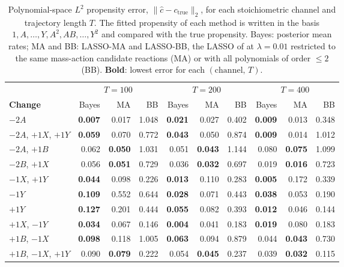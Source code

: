 \begin{table}[htbp]
\centering
\small
\caption{%
  Polynomial-space $L^2$ propensity error, $\|\hat{c} - c_{\mathrm{true}}\|_2$, for each stoichiometric
  channel and trajectory length $T$. The fitted propensity of each method is written in the basis
  $1, A, \dots, Y, A^2, AB, \dots, Y^2$ and compared with the true propensity. Bayes: posterior mean rates;
  MA and BB: LASSO-MA and LASSO-BB, the LASSO of \cite{siam_Zhang2019} at $\lambda = 0.01$
  restricted to the same mass-action candidate reactions (MA) or with all polynomials of order $\le 2$ (BB).
  \textbf{Bold}: lowest error for each $(\text{channel},\,T)$.
}
\label{tab:comparison-l2}
\setlength{\tabcolsep}{3pt}
\begin{tabular}{l|rrr|rrr|rrr}
\toprule
\multicolumn{1}{c}{} & \multicolumn{3}{c}{$T=100$} & \multicolumn{3}{c}{$T=200$} & \multicolumn{3}{c}{$T=400$} \\
\cmidrule(lr){2-4}\cmidrule(lr){5-7}\cmidrule(lr){8-10}
\textbf{Change} & Bayes & MA & BB & Bayes & MA & BB & Bayes & MA & BB \\
\midrule
$-2A$ & \textbf{0.007} & 0.017 & 1.048 & \textbf{0.021} & 0.027 & 0.402 & \textbf{0.009} & 0.013 & 0.348 \\
$-2A$, $+1X$, $+1Y$ & \textbf{0.059} & 0.070 & 0.772 & \textbf{0.043} & 0.050 & 0.874 & \textbf{0.009} & 0.014 & 1.012 \\
$-2A$, $+1B$ & 0.062 & \textbf{0.050} & 1.031 & 0.051 & \textbf{0.043} & 1.144 & 0.080 & \textbf{0.075} & 1.099 \\
$-2B$, $+1X$ & 0.056 & \textbf{0.051} & 0.729 & 0.036 & \textbf{0.032} & 0.697 & 0.019 & \textbf{0.016} & 0.723 \\
$-1X$, $+1Y$ & \textbf{0.044} & 0.098 & 0.226 & \textbf{0.013} & 0.110 & 0.283 & \textbf{0.005} & 0.172 & 0.339 \\
$-1Y$ & \textbf{0.109} & 0.552 & 0.644 & \textbf{0.028} & 0.071 & 0.443 & \textbf{0.038} & 0.053 & 0.190 \\
$+1Y$ & \textbf{0.127} & 0.201 & 0.444 & \textbf{0.055} & 0.082 & 0.393 & \textbf{0.012} & 0.046 & 0.144 \\
$+1X$, $-1Y$ & \textbf{0.034} & 0.067 & 0.146 & \textbf{0.004} & 0.041 & 0.183 & \textbf{0.019} & 0.080 & 0.183 \\
$+1B$, $-1X$ & \textbf{0.098} & 0.118 & 1.005 & \textbf{0.063} & 0.094 & 0.879 & 0.044 & \textbf{0.043} & 0.730 \\
$+1B$, $-1X$, $+1Y$ & 0.090 & \textbf{0.079} & 0.222 & 0.054 & \textbf{0.045} & 0.237 & 0.039 & \textbf{0.032} & 0.115 \\

\end{tabular}
\end{table}
